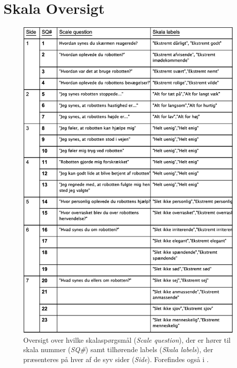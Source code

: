\section{Skala Oversigt}
\label{SkalaOversigt}
%
\begin{figure}[H]
\centering
\includegraphics[width = \textwidth]{Figure/DatabehandlingSkalaer/SkalaOversigt} 
\caption{Oversigt over hvilke skalaspørgsmål (\textit{Scale question}), der er hører til skala nummer (\textit{SQ\#}) samt tilhørende labels (\textit{Skala labels}), der præsenteres på hver af de syv sider (\textit{Side}). Forefindes også i .}
\label{fig:SkalaOversigt}
\end{figure}
\newpage
%